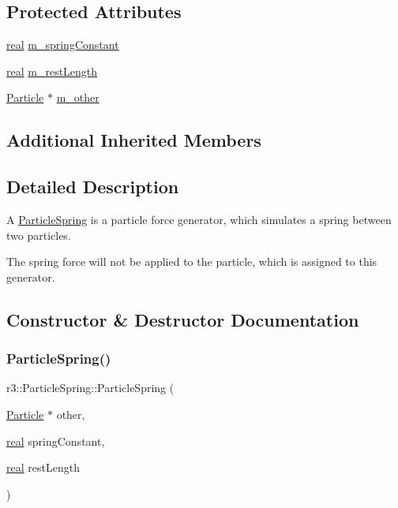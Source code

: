 \subsection*{Protected Attributes}
\begin{DoxyCompactItemize}
\item 
\mbox{\hyperlink{namespacer3_ab2016b3e3f743fb735afce242f0dc1eb}{real}} \mbox{\hyperlink{classr3_1_1_particle_spring_ad7386065bad41fc076f6882856923db7}{m\+\_\+spring\+Constant}}
\item 
\mbox{\hyperlink{namespacer3_ab2016b3e3f743fb735afce242f0dc1eb}{real}} \mbox{\hyperlink{classr3_1_1_particle_spring_a0ec4f3526a00ef338659c9ea4baf998b}{m\+\_\+rest\+Length}}
\item 
\mbox{\hyperlink{classr3_1_1_particle}{Particle}} $\ast$ \mbox{\hyperlink{classr3_1_1_particle_spring_af24b9bb50ddd33152892d21c7fdacc8a}{m\+\_\+other}}
\end{DoxyCompactItemize}
\subsection*{Additional Inherited Members}


\subsection{Detailed Description}
A \mbox{\hyperlink{classr3_1_1_particle_spring}{Particle\+Spring}} is a particle force generator, which simulates a spring between two particles. 

The spring force will not be applied to the particle, which is assigned to this generator. 

\subsection{Constructor \& Destructor Documentation}
\mbox{\label{classr3_1_1_particle_spring_af9b9193c28a36a6e070483136f63a9ab}} 
\subsubsection{\texorpdfstring{Particle\+Spring()}{ParticleSpring()}}
{\footnotesize\ttfamily r3\+::\+Particle\+Spring\+::\+Particle\+Spring (\begin{DoxyParamCaption}\item[{\mbox{\hyperlink{classr3_1_1_particle}{Particle}} $\ast$}]{other,  }\item[{\mbox{\hyperlink{namespacer3_ab2016b3e3f743fb735afce242f0dc1eb}{real}}}]{spring\+Constant,  }\item[{\mbox{\hyperlink{namespacer3_ab2016b3e3f743fb735afce242f0dc1eb}{real}}}]{rest\+Length }\end{DoxyParamCaption})}



